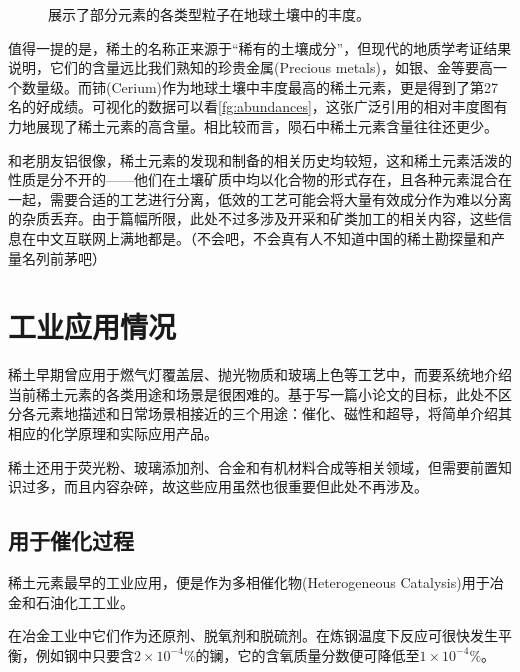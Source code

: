 \begin{figure}[H]
    \centering
    
    \caption{展示了部分元素的各类型粒子在地球土壤中的丰度。\cite{Haxel_2002}\label{fg:abundances}}
\end{figure}

值得一提的是，稀土的名称正来源于“稀有的土壤成分”，但现代的地质学考证结果说明，它们的含量远比我们熟知的珍贵金属(Precious metals)，如银、金等要高一个数量级。而铈(Cerium)作为地球土壤中丰度最高的稀土元素，更是得到了第27名的好成绩。可视化的数据可以看\autoref{fg:abundances}，这张广泛引用的相对丰度图有力地展现了稀土元素的高含量。相比较而言，陨石中稀土元素含量往往还更少。\cite{Balaram_2019}

和老朋友铝很像，稀土元素的发现和制备的相关历史均较短，这和稀土元素活泼的性质是分不开的——他们在土壤矿质中均以化合物的形式存在，且各种元素混合在一起，需要合适的工艺进行分离，低效的工艺可能会将大量有效成分作为难以分离的杂质丢弃。\cite{Atwood_2012,张晔_2019}由于篇幅所限，此处不过多涉及开采和矿类加工的相关内容，这些信息在中文互联网上满地都是。（不会吧，不会真有人不知道中国的稀土勘探量和产量名列前茅吧）

\section{工业应用情况}

稀土早期曾应用于燃气灯覆盖层、抛光物质和玻璃上色等工艺中，而要系统地介绍当前稀土元素的各类用途和场景是很困难的。基于写一篇小论文的目标，此处不区分各元素地描述和日常场景相接近的三个用途：催化、磁性和超导，将简单介绍其相应的化学原理和实际应用产品。

稀土还用于荧光粉、玻璃添加剂、合金和有机材料合成等相关领域\cite{JohnHamiltonWalrod_2012a,Dawei_2018,DeakinUniversity_2012}，但需要前置知识过多，而且内容杂碎，故这些应用虽然也很重要但此处不再涉及。

\subsection{用于催化过程}

稀土元素最早的工业应用，便是作为多相催化物(Heterogeneous Catalysis)用于冶金和石油化工工业。

在冶金工业中它们作为还原剂、脱氧剂和脱硫剂。在炼钢温度下反应可很快发生平衡，例如钢中只要含$2\times10^{-4}\%$的镧，它的含氧质量分数便可降低至$1\times10^{-4}\%$。\cite{gan2014inbook}

